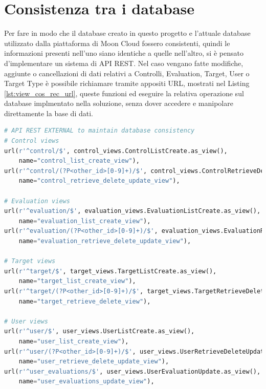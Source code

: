\section*{Consistenza tra i database}
Per fare in modo che il database creato in questo progetto e l'attuale database utilizzato dalla piattaforma di Moon Cloud 
fossero consistenti, quindi le informazioni presenti nell'uno siano identiche a quelle nell'altro, si è 
pensato d'implementare un sistema di API REST.\hfill\break
Nel caso vengano fatte modifiche, aggiunte o cancellazioni di dati relativi a Controlli, Evaluation, Target, User o Target Type 
è possibile richiamare tramite appositi URL, mostrati nel Listing \ref{lst:view_cos_rec_url}, queste funzioni ed eseguire la relativa 
operazione sul database implmentato nella soluzione, senza dover accedere e manipolare direttamente la base di dati.
\lstset{style=python_code_style}
\begin{lstlisting}[language=Python, label=lst:view_cos_rec_url, caption={Porzione di codice dell'URL Mapper contenti le URL usate per 
    mantenere la consistenza dei dati.}]
# API REST EXTERNAL to maintain database consistency
# Control views
url(r'^control/$', control_views.ControlListCreate.as_view(),
    name="control_list_create_view"),
url(r'^control/(?P<other_id>[0-9]+)/$', control_views.ControlRetrieveDeleteUpdate.as_view(),
    name="control_retrieve_delete_update_view"),
 
# Evaluation views
url(r'^evaluation/$', evaluation_views.EvaluationListCreate.as_view(),
    name="evaluation_list_create_view"),
url(r'^evaluation/(?P<other_id>[0-9]+)/$', evaluation_views.EvaluationRetrieveDeleteUpdate.as_view(),
    name="evaluation_retrieve_delete_update_view"),
 
# Target views
url(r'^target/$', target_views.TargetListCreate.as_view(),
    name="target_list_create_view"),
url(r'^target/(?P<other_id>[0-9]+)/$', target_views.TargetRetrieveDelete.as_view(),
    name="target_retrieve_delete_view"),
 
# User views
url(r'^user/$', user_views.UserListCreate.as_view(),
    name="user_list_create_view"),
url(r'^user/(?P<other_id>[0-9]+)/$', user_views.UserRetrieveDeleteUpdate.as_view(),
    name="user_retrieve_delete_update_view"),
url(r'^user_evaluations/$', user_views.UserEvaluationUpdate.as_view(),
    name="user_evaluations_update_view"),
\end{lstlisting}
%
\newpage
%
